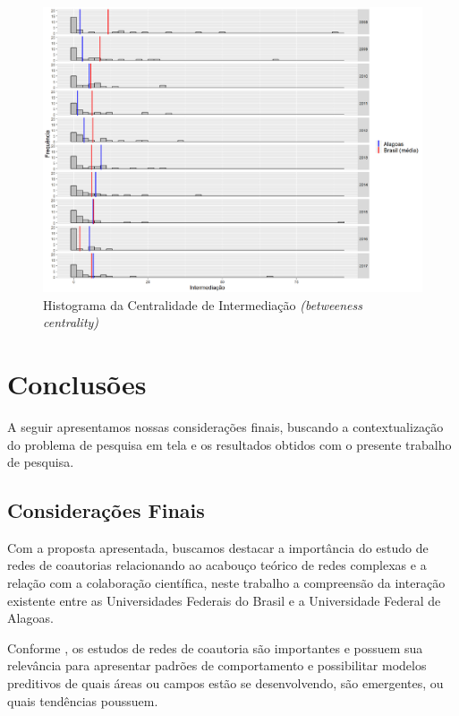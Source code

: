 \documentclass[12pt]{article}
\begin{document}
\begin{figure}[H]
\centering
\includegraphics[scale=0.6]{images/betweeness-hist.pdf}
\caption{Histograma da Centralidade de Intermediação \textit{(betweeness centrality)}}
\label{c22}
\end{figure}

\section{Conclusões}

A seguir apresentamos nossas considerações finais, buscando a contextualização do problema de pesquisa em tela e os resultados obtidos com o presente trabalho de pesquisa.

\subsection{Considerações Finais}

Com a proposta apresentada, buscamos destacar a importância do estudo de redes de coautorias relacionando ao acabouço teórico de redes complexas e a relação com a colaboração científica, neste trabalho a compreensão da interação existente entre as Universidades Federais do Brasil e a Universidade Federal de Alagoas.

Conforme \citep{barabasi2002evolution}, os estudos de redes de coautoria são importantes e possuem sua relevância para apresentar padrões de comportamento e possibilitar modelos preditivos de quais áreas ou campos estão se desenvolvendo, são emergentes, ou quais tendências poussuem.
\end{document}
